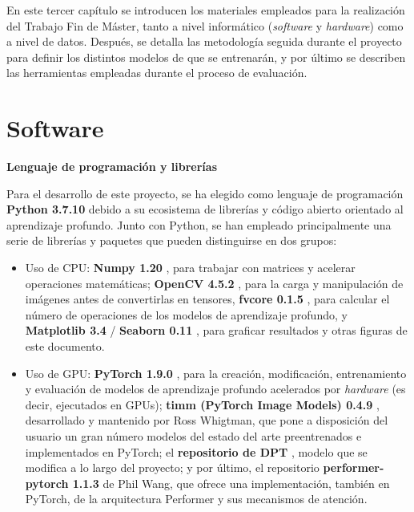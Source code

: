 
En este tercer capítulo se introducen los materiales empleados para la realización del Trabajo Fin de Máster, tanto a nivel informático (\textit{software} y \textit{hardware}) como a nivel de datos. Después, se detalla las metodología seguida durante el proyecto para definir los distintos modelos de que se entrenarán, y por último se describen las herramientas empleadas durante el proceso de evaluación.

\section{Software}

\textbf{Lenguaje de programación y librerías}

Para el desarrollo de este proyecto, se ha elegido como lenguaje de programación \textbf{Python 3.7.10} debido a su ecosistema de librerías y código abierto orientado al aprendizaje profundo. Junto con Python, se han empleado principalmente una serie de librerías y paquetes que pueden distinguirse en dos grupos: 
\begin{itemize}
\item Uso de CPU: \textbf{Numpy 1.20} \cite{numpy}, para trabajar con matrices y acelerar operaciones matemáticas; \textbf{OpenCV 4.5.2} \cite{opencv_library}, para la carga y manipulación de imágenes antes de convertirlas en tensores, \textbf{fvcore 0.1.5} \cite{fvcore}, para calcular el número de operaciones de los modelos de aprendizaje profundo, y \textbf{Matplotlib 3.4} \cite{matplotlib} / \textbf{Seaborn 0.11} \cite{seaborn}, para graficar resultados y otras figuras de este documento.
\item Uso de GPU: \textbf{PyTorch 1.9.0} \cite{pytorch}, para la creación, modificación, entrenamiento y evaluación de modelos de aprendizaje profundo acelerados por \textit{hardware} (es decir, ejecutados en GPUs); \textbf{timm (PyTorch Image Models) 0.4.9} \cite{timm}, desarrollado y mantenido por Ross Whigtman, que pone a disposición del usuario un gran número modelos del estado del arte preentrenados e implementados en PyTorch; el \textbf{repositorio de DPT} \cite{visiontransformersDPT}, modelo que se modifica a lo largo del proyecto; y por último, el repositorio \textbf{performer-pytorch 1.1.3} \cite{pwperformer} de Phil Wang, que ofrece una implementación, también en PyTorch, de la arquitectura Performer y sus mecanismos de atención.
\end{itemize}

